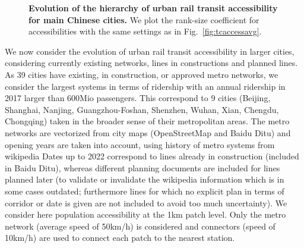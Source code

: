 \begin{figure}
	\caption{\textbf{Evolution of the hierarchy of urban rail transit accessibility for main Chinese cities.} We plot the rank-size coefficient for accessibilities with the same settings as in Fig.~\ref{fig:tcaccessavg}.\label{fig:tcaccesshierarchy}}
\end{figure}




We now consider the evolution of urban rail transit accessibility in larger cities, considering currently existing networks, lines in constructions and planned lines. As 39 cities have existing, in construction, or approved metro networks, we consider the largest systems in terms of ridership with an annual ridership in 2017 larger than 600Mio passengers. This correspond to 9 cities (Beijing, Shanghai, Nanjing, Guangzhou-Foshan, Shenzhen, Wuhan, Xian, Chengdu, Chongqing) taken in the broader sense of their metropolitan areas. The metro networks are vectorized from city maps (OpenStreetMap and Baidu Ditu) and opening years are taken into account, using history of metro systems from wikipedia Dates up to 2022 correspond to lines already in construction (included in Baidu Ditu), whereas different planning documents are included for lines planned later (to validate or invalidate the wikipedia information which is in some cases outdated; furthermore lines for which no explicit plan in terms of corridor or date is given are not included to avoid too much uncertainty). We consider here population accessibility at the 1km patch level. Only the metro network (average speed of 50km/h) is considered and connectors (speed of 10km/h) are used to connect each patch to the nearest station.




